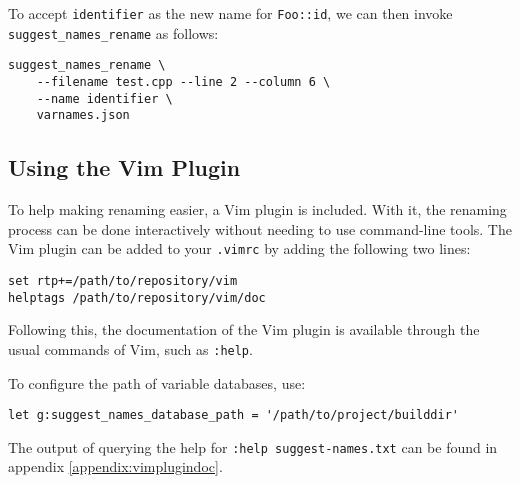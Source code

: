 To accept \lstinline|identifier| as the new name for \lstinline|Foo::id|, we can
then invoke \lstinline|suggest_names_rename| as follows:
\begin{lstlisting}[caption={Invocation of \lstinline|suggest_name_rename|}]
suggest_names_rename \
	--filename test.cpp --line 2 --column 6 \
	--name identifier \
	varnames.json
\end{lstlisting}

\subsection{Using the Vim Plugin}
To help making renaming easier, a Vim \cite{vim} plugin is included.
With it, the renaming process can be done interactively without needing to use
command-line tools.
The Vim plugin can be added to your \lstinline|.vimrc| by adding the following
two lines:

\begin{lstlisting}[language=vimscript, caption={Adding the Vim plugin}]
set rtp+=/path/to/repository/vim
helptags /path/to/repository/vim/doc
\end{lstlisting}

Following this, the documentation of the Vim plugin is available through the
usual commands of Vim, such as \lstinline|:help|.

To configure the path of variable databases, use:

\begin{lstlisting}[language=vimscript, caption={Setting Databases Path}]
let g:suggest_names_database_path = '/path/to/project/builddir'
\end{lstlisting}

The output of querying the help for \lstinline|:help suggest-names.txt| can be
found in appendix \ref{appendix:vimplugindoc}.
